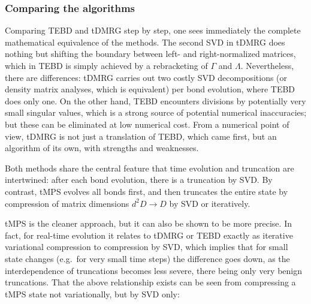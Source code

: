 \subsubsection{Comparing the algorithms}
Comparing TEBD and tDMRG step by step, one sees immediately the complete mathematical equivalence of the methods. The second SVD in tDMRG does nothing but shifting the boundary between left- and right-normalized matrices, which in TEBD is simply achieved by a rebracketing of $\Gamma$ and $\Lambda$. Nevertheless, there are differences: tDMRG carries out two costly SVD decompositions (or density matrix analyses, which is equivalent) per bond evolution, where TEBD does only one. On the other hand, TEBD encounters divisions by potentially very small singular values, which is a strong source of potential numerical inaccuracies; but these can be eliminated \cite{Hastings09} at low numerical cost. From a numerical point of view, tDMRG is not just a translation of TEBD, which came first, but an algorithm of its own, with strengths and weaknesses.

Both methods share the central feature that time evolution and truncation are intertwined: after each bond evolution, there is a truncation by SVD. By contrast, tMPS evolves all bonds first, and then truncates the entire state by compression of matrix dimensions $d^2 D \rightarrow D$ by SVD or iteratively. 

tMPS is the cleaner approach, but it can also be shown to be more precise. In fact, for real-time evolution it relates to tDMRG or TEBD exactly as iterative variational compression to compression by SVD, which implies that for small state changes (e.g.\ for very small time steps) the difference goes down, as the interdependence of truncations becomes less severe, there being only very benign truncations. That the above relationship exists can be seen from compressing a tMPS state not variationally, but by SVD only: 

